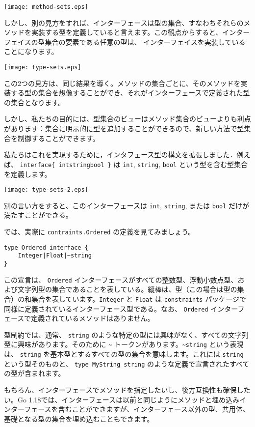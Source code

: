 \texttt{[image: method-sets.eps]}

しかし、別の見方をすれば、インターフェースは型の集合、すなわちそれらのメソッドを実装する型を定義していると言えます。この観点からすると、インターフェイスの型集合の要素である任意の型は、
インターフェイスを実装していることになります。

\texttt{[image: type-sets.eps]}

この2つの見方は、同じ結果を導く。メソッドの集合ごとに、そのメソッドを実装する型の集合を想像することができ、それがインターフェースで定義された型の集合となります。

しかし、私たちの目的には、型集合のビューはメソッド集合のビューよりも利点があります：集合に明示的に型を追加することができるので、新しい方法で型集合を制御することができます。

私たちはこれを実現するために，インタフェース型の構文を拡張しました．例えば、
\texttt{interface\{\ int\textbar{}string\textbar{}bool\ \}} は
\texttt{int}, \texttt{string}, \texttt{bool}
という型を含む型集合を定義します。

\texttt{[image: type-sets-2.eps]}

別の言い方をすると、このインターフェースは \texttt{int},
\texttt{string}, または \texttt{bool} だけが満たすことができる。

では、実際に \texttt{contraints.Ordered} の定義を見てみましょう。

\begin{lstlisting}[numbers=none]
type Ordered interface {
    Integer|Float|~string
}
\end{lstlisting}

この宣言は、 \texttt{Ordered}
インターフェースがすべての整数型、浮動小数点型、および文字列型の集合であることを表している。縦棒は、型（この場合は型の集合）の和集合を表しています。\texttt{Integer}
と \texttt{Float} は \texttt{constraints}
パッケージで同様に定義されているインターフェース型である。なお、
\texttt{Ordered} インターフェースで定義されているメソッドはありません。

型制約では、通常、 \texttt{string}
のような特定の型には興味がなく、すべての文字列型に興味があります。そのために
\texttt{\textasciitilde{}}
トークンがあります。\texttt{\textasciitilde{}string} という表現は、
\texttt{string} を基本型とするすべての型の集合を意味します。これには
\texttt{string} という型そのものと、 \texttt{type\ MyString\ string}
のような定義で宣言されたすべての型が含まれます。

もちろん、インターフェースでメソッドを指定したいし、後方互換性も確保したい。Go
1.18では、インターフェースは以前と同じようにメソッドと埋め込みインターフェースを含むことができますが、インターフェース以外の型、共用体、基礎となる型の集合を埋め込むこともできます。

